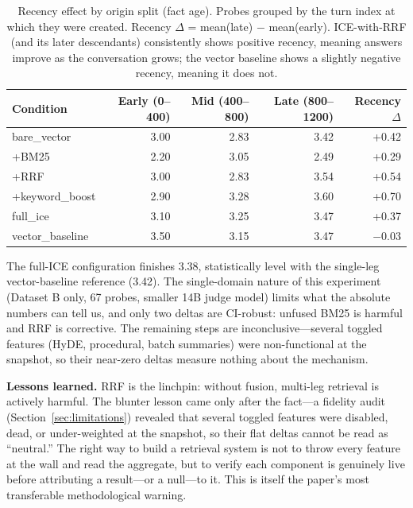 \documentclass[10pt]{article}
\begin{document}
\begin{table}[htbp]
\centering
\small
\caption{Recency effect by origin split (fact age). Probes grouped by the turn index at which they were created. Recency $\Delta$ = mean(late) $-$ mean(early). ICE-with-RRF (and its later descendants) consistently shows positive recency, meaning answers improve as the conversation grows; the vector baseline shows a slightly negative recency, meaning it does not.}
\label{tab:ablation-recency}
\begin{tabular}{lrrrr}
\toprule
\textbf{Condition} & \textbf{Early (0--400)} & \textbf{Mid (400--800)} & \textbf{Late (800--1200)} & \textbf{Recency $\Delta$} \\
\midrule
bare\_vector       & 3.00 & 2.83 & 3.42 & +0.42 \\
+BM25              & 2.20 & 3.05 & 2.49 & +0.29 \\
+RRF               & 3.00 & 2.83 & 3.54 & +0.54 \\
+keyword\_boost    & 2.90 & 3.28 & 3.60 & +0.70 \\
full\_ice          & 3.10 & 3.25 & 3.47 & +0.37 \\
vector\_baseline   & 3.50 & 3.15 & 3.47 & $-0.03$ \\
\bottomrule
\end{tabular}
\end{table}

The full-ICE configuration finishes 3.38, statistically level with the single-leg vector-baseline reference (3.42). The single-domain nature of this experiment (Dataset B only, 67 probes, smaller 14B judge model) limits what the absolute numbers can tell us, and only two deltas are CI-robust: unfused BM25 is harmful and RRF is corrective. The remaining steps are inconclusive---several toggled features (HyDE, procedural, batch summaries) were non-functional at the snapshot, so their near-zero deltas measure nothing about the mechanism.

\textbf{Lessons learned.} RRF is the linchpin: without fusion, multi-leg retrieval is actively harmful. The blunter lesson came only after the fact---a fidelity audit (Section~\ref{sec:limitations}) revealed that several toggled features were disabled, dead, or under-weighted at the snapshot, so their flat deltas cannot be read as ``neutral.'' The right way to build a retrieval system is not to throw every feature at the wall and read the aggregate, but to verify each component is genuinely live before attributing a result---or a null---to it. This is itself the paper's most transferable methodological warning.
\end{document}
